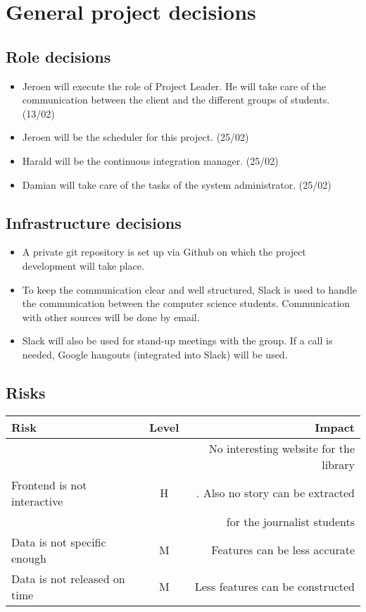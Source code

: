 \chapter{General project decisions}

\section{Role decisions}

\begin{itemize}
 \item Jeroen will execute the role of Project Leader. He will take care of the communication between the client and the different groups of students. (13/02)
 \item Jeroen will be the scheduler for this project. (25/02)
 \item Harald will be the continuous integration manager. (25/02)
 \item Damian will take care of the tasks of the system administrator. (25/02)
\end{itemize}

\section{Infrastructure decisions}
\begin{itemize}
	\item A private git repository is set up via Github on which the project development will take place.
    \item To keep the communication clear and well structured, Slack is used to handle the communication between the computer science students. Communication with other sources will be done by email. 
    \item Slack will also be used for stand-up meetings with the group. If a call is needed, Google hangouts (integrated into Slack) will be used.
\end{itemize}

\section{Risks}

\begin{center}
  \begin{tabular}{ l | c | r  }
    \hline
    Risk & Level & Impact \\ \hline
   & & No interesting website for the library\\
      Frontend is not interactive & H & . Also no story can be extracted\\
    & &  for the journalist students \\
    Data is not specific enough & M & Features can be less accurate \\
    Data is not released on time & M & Less features can be constructed\\
  \end{tabular}
\end{center}